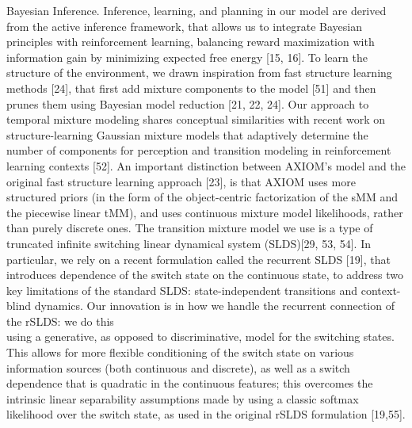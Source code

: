 \documentclass[10pt]{article}
\begin{document}
Bayesian Inference. Inference, learning, and planning in our model are derived from the active inference framework, that allows us to integrate Bayesian principles with reinforcement learning, balancing reward maximization with information gain by minimizing expected free energy [15, 16]. To learn the structure of the environment, we drawn inspiration from fast structure learning methods [24], that first add mixture components to the model [51] and then prunes them using Bayesian model reduction [21, 22, 24]. Our approach to temporal mixture modeling shares conceptual similarities with recent work on structure-learning Gaussian mixture models that adaptively determine the number of components for perception and transition modeling in reinforcement learning contexts [52]. An important distinction between AXIOM's model and the original fast structure learning approach [23], is that AXIOM uses more structured priors (in the form of the object-centric factorization of the sMM and the piecewise linear tMM), and uses continuous mixture model likelihoods, rather than purely discrete ones. The transition mixture model we use is a type of truncated infinite switching linear dynamical system (SLDS)[29, 53, 54]. In particular, we rely on a recent formulation called the recurrent SLDS [19], that introduces dependence of the switch state on the continuous state, to address two key limitations of the standard SLDS: state-independent transitions and context-blind dynamics. Our innovation is in how we handle the recurrent connection of the rSLDS: we do this\\[0pt]
using a generative, as opposed to discriminative, model for the switching states. This allows for more flexible conditioning of the switch state on various information sources (both continuous and discrete), as well as a switch dependence that is quadratic in the continuous features; this overcomes the intrinsic linear separability assumptions made by using a classic softmax likelihood over the switch state, as used in the original rSLDS formulation [19,55].
\end{document}
